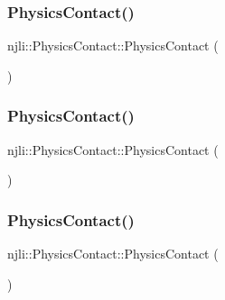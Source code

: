 \subsubsection{\texorpdfstring{Physics\+Contact()}{PhysicsContact()}\hspace{0.1cm}{\footnotesize\ttfamily [1/3]}}
{\footnotesize\ttfamily njli\+::\+Physics\+Contact\+::\+Physics\+Contact (\begin{DoxyParamCaption}{ }\end{DoxyParamCaption})\hspace{0.3cm}{\ttfamily [protected]}}

\mbox{\label{classnjli_1_1_physics_contact_a31d3673b8451cfe4ea8c0c2e3436a593}} 
\subsubsection{\texorpdfstring{Physics\+Contact()}{PhysicsContact()}\hspace{0.1cm}{\footnotesize\ttfamily [2/3]}}
{\footnotesize\ttfamily njli\+::\+Physics\+Contact\+::\+Physics\+Contact (\begin{DoxyParamCaption}\item[{const \mbox{\hyperlink{classnjli_1_1_abstract_builder}{Abstract\+Builder}} \&}]{ }\end{DoxyParamCaption})\hspace{0.3cm}{\ttfamily [protected]}}

\mbox{\label{classnjli_1_1_physics_contact_a1bb94f2e84e93ae7060f5d0d6edc20c8}} 
\subsubsection{\texorpdfstring{Physics\+Contact()}{PhysicsContact()}\hspace{0.1cm}{\footnotesize\ttfamily [3/3]}}
{\footnotesize\ttfamily njli\+::\+Physics\+Contact\+::\+Physics\+Contact (\begin{DoxyParamCaption}\item[{const \mbox{\hyperlink{classnjli_1_1_physics_contact}{Physics\+Contact}} \&}]{ }\end{DoxyParamCaption})\hspace{0.3cm}{\ttfamily [protected]}}

